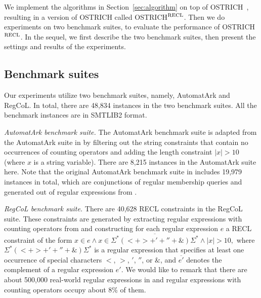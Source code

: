 %

We implement the algorithms in Section~\ref{sec:algorithm} on top of OSTRICH~\cite{ostrich,atva2020}, resulting in a version of OSTRICH called OSTRICH$^{\rm RECL}$.
Then we do experiments on two benchmark suites, to evaluate the performance of OSTRICH$^{\rm RECL}$. In the sequel, we first describe the two benchmark suites, then present the settings and results of the experiments. 


\subsection{Benchmark suites}

Our experiments utilize two benchmark suites, namely, AutomatArk and RegCoL. In total, there are 48,834 instances in the two benchmark suites. All the benchmark instances are in SMTLIB2 format. 

\medskip
\noindent
\emph{AutomatArk benchmark suite.}
The AutomatArk benchmark suite is adapted from the AutomatArk suite in \cite{z3str3re} by filtering out the string constraints that contain no occurrences of counting operators and adding the length constraint $|x| > 10$ (where $x$ is a string variable). There are 8,215 instances in the AutomatArk suite here.
Note that the original AutomatArk benchmark suite in \cite{z3str3re} includes 19,979 instances in total, which are conjunctions of regular membership queries and generated out of regular expressions from \cite{automatark}. 

\medskip
\noindent
\emph{RegCoL benchmark suite.} There are 40,628 RECL constraints in the RegCoL suite. These constraints are generated by extracting regular expressions with counting operators from \cite{regex_lingua_franca,redos_lenka} and constructing for each regular expression $e$ a RECL constraint of the form 
$x \in e \wedge x \in \overline{\Sigma^*(<+ >+'+''+\&)\Sigma^*} \wedge |x| > 10,$   
where $\Sigma^*(<+ >+'+''+\&)\Sigma^*$ is a regular expression that specifies at least one occurrence of special characters $<$, $>$, $'$, $''$, or $\&$, and $\overline{e'}$ denotes the complement of a regular expression $e'$. We would like to remark that there are about 500,000 real-world regular expressions in \cite{regex_lingua_franca,redos_lenka} and regular expressions with counting operators occupy about 8\% of them. 

